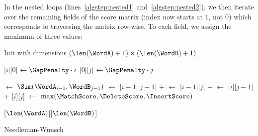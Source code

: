 In the nested loops (lines~\ref{algstep:nested1} and~\ref{algstep:nested2}), we then iterate over the remaining fields of the score matrix (index now starts at $1$, not $0$) which corresponds to traversing the matrix row-wise. To each field, we assign the maximum of three values:


\begin{algorithm*}
    \DontPrintSemicolon
    
    \newcommand{\ScoreMatrixIdx}[2]{{\ScoreMatrix}[{#1}][{#2}]}

    \KwOut{\Score}
    \Fn{\calcScoreFunc{}}
    {
        Init \ScoreMatrix with dimensions $(\len(\WordA)+1) \times (\len(\WordB)+1)$\;

        \BlankLine

        {
            \ScoreMatrixIdx{$i$}{$0$} $\gets \GapPenalty \cdot i$\;
        }
        {
            \ScoreMatrixIdx{$0$}{$j$} $\gets \GapPenalty \cdot j$
            \label{algstep:init-gap-end}\;
        }

        \BlankLine

        {
            {
                \Cost $\gets$ $\Sim(\WordA_{i-1}, \WordB_{j-1})$\;
                \MatchScore $\gets$ \ScoreMatrixIdx{$i-1$}{$j-1$} + \Cost
                \label{algstep:matchscore}\;
                \DeleteScore $\gets$ \ScoreMatrixIdx{$i-1$}{$j$} + \GapPenalty
                \label{algstep:deletescore}\;
                \InsertScore $\gets$ \ScoreMatrixIdx{$i$}{$j-1$} + \GapPenalty
                \label{algstep:insertscore}\;
                \ScoreMatrixIdx{$i$}{$j$} $\gets$ $\max(\MatchScore, \DeleteScore, \InsertScore)$\;
            }
        }

        \BlankLine

        \Return\! \ScoreMatrixIdx{$\len(\WordA)$}{$\len(\WordB)$}\;
    }
    
    \caption{Needleman-Wunsch}
    \label{alg:needleman-wunsch}
\end{algorithm*}

